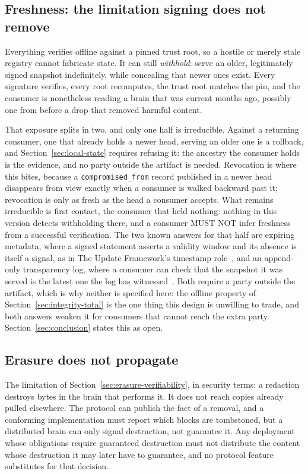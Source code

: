 \documentclass[11pt,a4paper]{article}
\begin{document}
\subsection{Freshness: the limitation signing does not remove}
\label{sec:freshness}

Everything verifies offline against a pinned trust root, so a hostile or merely
stale registry cannot fabricate state. It can still \emph{withhold}: serve an
older, legitimately signed snapshot indefinitely, while concealing that newer
ones exist. Every signature verifies, every root recomputes, the trust root
matches the pin, and the consumer is nonetheless reading a brain that was
current months ago, possibly one from before a drop that removed harmful content.

That exposure splits in two, and only one half is irreducible. Against a
returning consumer, one that already holds a newer head, serving an older one
is a rollback, and Section~\ref{sec:local-state} requires refusing it: the
ancestry the consumer holds is the evidence, and no party outside the artifact
is needed. Revocation is where this bites, because a
\texttt{compromised\_from} record published in a newer head disappears from
view exactly when a consumer is walked backward past it; revocation is only as
fresh as the head a consumer accepts. What remains irreducible is first
contact, the consumer that held nothing: nothing in this version detects
withholding there, and a consumer MUST NOT infer freshness from a successful
verification. The two known answers for that half are expiring metadata,
where a signed statement asserts a validity window and its absence is itself a
signal, as in The Update Framework's timestamp role~\cite{samuel2010tuf}, and an
append-only transparency log, where a consumer can check that the snapshot it was
served is the latest one the log has witnessed~\cite{rfc9162}. Both require a
party outside the artifact, which is why neither is specified here: the offline property of
Section~\ref{sec:integrity-total} is the one thing this design is unwilling to
trade, and both answers weaken it for consumers that cannot reach the extra
party. Section~\ref{sec:conclusion} states this as open.

\subsection{Erasure does not propagate}

The limitation of Section~\ref{sec:erasure-verifiability}, in security terms:
a redaction destroys bytes in the brain that performs it. It does
not reach copies already pulled elsewhere. The protocol can publish the fact of a
removal, and a conforming implementation must report which blocks are
tombstoned, but a distributed brain can only signal destruction, not guarantee
it. Any deployment whose obligations require guaranteed destruction must not
distribute the content whose destruction it may later have to guarantee, and no
protocol feature substitutes for that decision.
\end{document}
